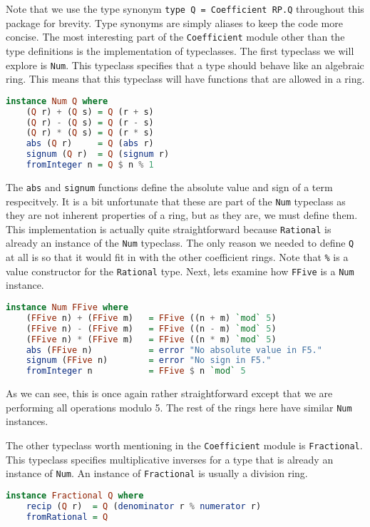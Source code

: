 \documentclass[MS, xcolor=dvipsnames]{wfuthesis}
\theoremstyle{definition}
\begin{document}
Note that we use the type synonym \lstinline{type Q = Coefficient RP.Q} throughout this package for brevity. Type synonyms are simply aliases to keep the code more concise. The most interesting part of the \lstinline{Coefficient} module other than the type definitions is the implementation of typeclasses. The first typeclass we will explore is \lstinline{Num}. This typeclass specifies that a type should behave like an algebraic ring. This means that this typeclass will have functions that are allowed in a ring.
\begin{lstlisting}[language=Haskell]
instance Num Q where
    (Q r) + (Q s) = Q (r + s)
    (Q r) - (Q s) = Q (r - s)
    (Q r) * (Q s) = Q (r * s)
    abs (Q r)     = Q (abs r)
    signum (Q r)  = Q (signum r)
    fromInteger n = Q $ n % 1
\end{lstlisting}
The \lstinline{abs} and \lstinline{signum} functions define the absolute value and sign of a term respecitvely. It is a bit unfortunate that these are part of the \lstinline{Num} typeclass as they are not inherent properties of a ring, but as they are, we must define them. This implementation is actually quite straightforward because \lstinline{Rational} is already an instance of the \lstinline{Num} typeclass. The only reason we needed to define \lstinline{Q} at all is so that it would fit in with the other coefficient rings. Note that \lstinline{%} is a value constructor for the \lstinline{Rational} type. Next, lets examine how \lstinline{FFive} is a \lstinline{Num} instance.
\begin{lstlisting}[language=Haskell]
instance Num FFive where
    (FFive n) + (FFive m)   = FFive ((n + m) `mod` 5)
    (FFive n) - (FFive m)   = FFive ((n - m) `mod` 5)
    (FFive n) * (FFive m)   = FFive ((n * m) `mod` 5)
    abs (FFive n)           = error "No absolute value in F5."
    signum (FFive n)        = error "No sign in F5."
    fromInteger n           = FFive $ n `mod` 5
\end{lstlisting}
As we can see, this is once again rather straightforward except that we are performing all operations modulo 5. The rest of the rings here have similar \lstinline{Num} instances. \par
The other typeclass worth mentioning in the \lstinline{Coefficient} module is \lstinline{Fractional}. This typeclass specifies multiplicative inverses for a type that is already an instance of \lstinline{Num}. An instance of \lstinline{Fractional} is usually a division ring.
\begin{lstlisting}[language=Haskell]
instance Fractional Q where
    recip (Q r)  = Q (denominator r % numerator r)
    fromRational = Q
\end{lstlisting}
\end{document}

